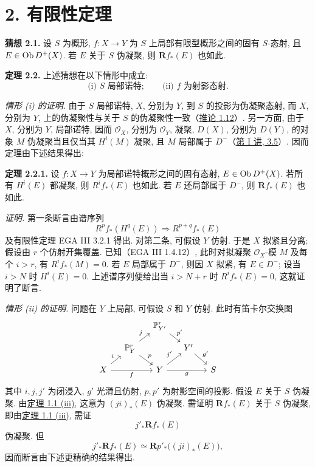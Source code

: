 \section*{2. 有限性定理}

\textbf{猜想 2.1.} 设 \(S\) 为概形, \(f:X\to Y\) 为 $S$ 上局部有限型概形之间的固有 \(S\)-态射, 且 \(E\in \operatorname{Ob} D^+(X)\). 若 \(E\) 关于 \(S\) 伪凝聚, 则 \(\mathbf R f_*(E)\) 也如此.

\textbf{定理 2.2.} 上述猜想在以下情形中成立:
\[
  \text{(i) } S\text{ 局部诺特};\qquad
  \text{(ii) } f\text{ 为射影态射}.
\]

\emph{情形 (i) 的证明.} 由于 \(S\) 局部诺特, \(X\), 分别为 \(Y\), 到 \(S\) 的投影为伪凝聚态射, 而 \(X\), 分别为 \(Y\), 上的伪凝聚性与关于 \(S\) 的伪凝聚性一致（\hyperlink{sga6.e03.cor.1-12}{推论 1.12}）. 另一方面, 由于 \(X\), 分别为 \(Y\), 局部诺特, 因而 \(\mathcal O_X\), 分别为 \(\mathcal O_Y\), 凝聚, \(D(X)\), 分别为 \(D(Y)\), 的对象 \(M\) 伪凝聚当且仅当其 \(H^i(M)\) 凝聚, 且 \(M\) 局部属于 \(D^{-}\)（\hyperlink{sga6.e01.cor.3-5}{第 I 讲, 3.5}）. 因而定理由下述结果得出:

\textbf{定理 2.2.1.} 设 \(f:X\to Y\) 为局部诺特概形之间的固有态射, \(E\in \operatorname{Ob} D^+(X)\). 若所有 \(H^i(E)\) 都凝聚, 则 \(R^if_*(E)\) 也如此. 若 \(E\) 还局部属于 \(D^{-}\), 则 \(\mathbf Rf_*(E)\) 也如此.

\emph{证明.} 第一条断言由谱序列
\[
  R^pf_*(H^q(E)) \Longrightarrow R^{p+q}f_*(E)
\]
及有限性定理 EGA III 3.2.1 得出. 对第二条, 可假设 \(Y\) 仿射. 于是 \(X\) 拟紧且分离; 假设由 \(r\) 个仿射开集覆盖. 已知（EGA III 1.4.12）, 此时对拟凝聚 \(\mathcal O_X\)-模 \(M\) 及每个 \(i>r\), 有 \(R^if_*(M)=0\). 若 \(E\) 局部属于 \(D^{-}\), 则因 \(X\) 拟紧, 有 \(E\in D^{-}\); 设当 \(i>N\) 时 \(H^i(E)=0\). 上述谱序列便给出当 \(i>N+r\) 时 \(R^if_*(E)=0\), 这就证明了断言.

\emph{情形 (ii) 的证明.} 问题在 \(Y\) 上局部, 可假设 \(S\) 和 \(Y\) 仿射. 此时有笛卡尔\mbox{交换图}
\[
\begin{tikzcd}[column sep=small,row sep=small]
&&\mathbb P^r_{Y'}\arrow[dr,"p'"]&&\\
&\mathbb P^r_Y\arrow[ur,"j"]\arrow[dr,"p"]&&Y'\arrow[dr,"g'"]&\\
X\arrow[ur,"i"]\arrow[rr,"f"']&&Y\arrow[ur,"j'"]\arrow[rr,"g"']&&S
\end{tikzcd}
\]
其中 \(i,j,j'\) 为闭浸入, \(g'\) 光滑且仿射, \(p,p'\) 为射影空间的投影. 假设 \(E\) 关于 \(S\) 伪凝聚. 由\hyperlink{sga6.e03.thm.1-1}{定理 1.1 (iii)}, 这意为 \((ji)_*(E)\) 伪凝聚. 需证明 \(\mathbf Rf_*(E)\) 关于 \(S\) 伪凝聚, 即由\hyperlink{sga6.e03.thm.1-1}{定理 1.1 (iii)}, 需证
\[
  j'_*\mathbf Rf_*(E)
\]
伪凝聚. 但
\[
  j'_*\mathbf Rf_*(E)\simeq \mathbf Rp'_*\bigl((ji)_*(E)\bigr),
\]
因而断言由下述更精确的结果得出.

